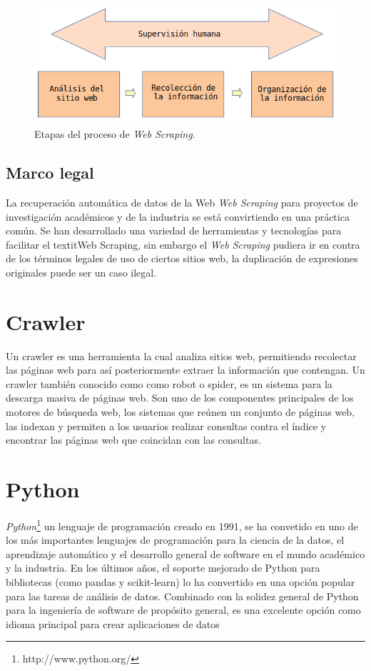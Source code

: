 \begin{figure}[H]
    \centering
    \includegraphics[scale=.35]{imagenes/Capitulo5/procesos}
    \caption{Etapas del proceso de \textit{Web Scraping}.}
    \label{fig:procesos}
  \end{figure}
  

\subsection{Marco legal}
La recuperación automática de datos de la Web \textit{Web Scraping} para proyectos de investigación académicos y de la 
industria se está convirtiendo en una práctica común. Se han desarrollado una variedad de herramientas y tecnologías 
para facilitar el textit{Web Scraping}, sin embargo el \textit{Web Scraping} pudiera ir en contra de los términos legales 
de uso de ciertos sitios web, la duplicación de expresiones originales puede ser un caso ilegal.


\section{Crawler}
Un crawler \citep{CT14} es una herramienta la cual analiza sitios web, permitiendo recolectar 
las páginas web para así posteriormente extraer la información que contengan. Un crawler también 
conocido como como robot o spider, es un sistema para la descarga masiva de páginas web. Son uno de 
los componentes principales de los motores de búsqueda web, los sistemas que reúnen un conjunto de 
páginas web, las indexan y permiten a los usuarios realizar consultas contra el índice y encontrar las 
páginas web que coincidan con las consultas.

\section{Python}
\textit{Python}\footnote{http://www.python.org/} un lenguaje de programación creado en 1991, se ha convetido en uno de los más 
importantes lenguajes de programación para la ciencia de la datos, el aprendizaje automático y el desarrollo general de software en 
el mundo académico y la industria. 
En los últimos años, el soporte mejorado de Python para bibliotecas (como pandas y scikit-learn) lo ha convertido en una opción popular 
para las tareas de análisis de datos. Combinado con la solidez general de Python para la ingeniería de software de propósito general, 
es una excelente opción como idioma principal para crear aplicaciones de datos %

